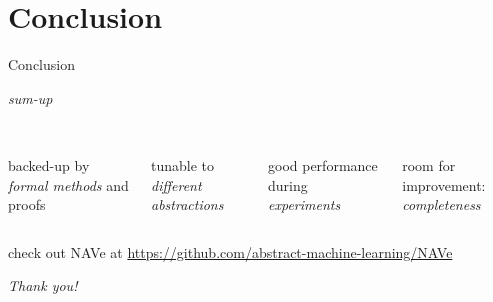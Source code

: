 \documentclass[11pt]{beamer}
\begin{document}
\section{Conclusion}
\begin{frame}{Conclusion}
\begin{center}
 \Large\emph{sum-up}
\end{center}

\begin{columns}
 \begin{column}{0.25\textwidth}
  \centering
  \\
  backed-up by \emph{formal methods} and proofs
 \end{column}
 \begin{column}{0.25\textwidth}
  \centering
  \\
  tunable to \emph{different abstractions}
 \end{column}
 \begin{column}{0.25\textwidth}
  \centering
  \\
  good performance during \emph{experiments}
 \end{column}
 \begin{column}{0.25\textwidth}
  \centering
  \\
  room for improvement: \emph{completeness}
 \end{column}
\end{columns}

\vspace{2em}
\begin{center}
 check out NAVe at
 \url{https://github.com/abstract-machine-learning/NAVe}
\end{center}
\end{frame}

\begin{frame}{}
 \centering
 \Large
 \emph{Thank you!}
 
 \vspace{1em}
  
\end{frame}
\end{document}
